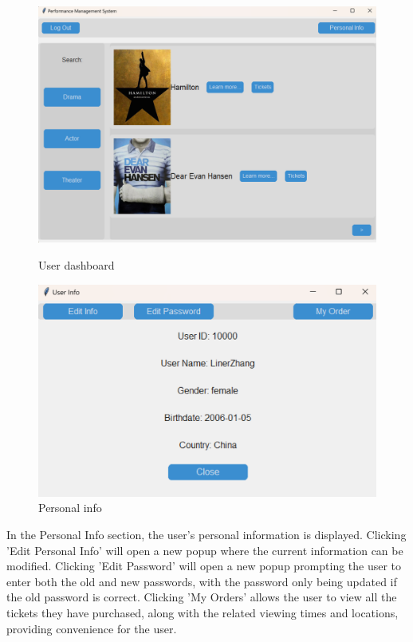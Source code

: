 \documentclass[12pt]{article}
\begin{document}
\begin{figure}[H]
    \centering
    \begin{minipage}{0.48\textwidth}
        \centering
        \includegraphics[width=\textwidth]{6.png}
        \caption{User dashboard}
        \label{Figure 6}
    \end{minipage}
    \hfill
    \begin{minipage}{0.48\textwidth}
        \centering
        \includegraphics[width=\textwidth]{7.png}
        \caption{Personal info}
        \label{Figure 7}
    \end{minipage}
\end{figure}
\par In the Personal Info section, the user's personal information is displayed. Clicking 'Edit Personal Info' will open a new popup where the current information can be modified. Clicking 'Edit Password' will open a new popup prompting the user to enter both the old and new passwords, with the password only being updated if the old password is correct. Clicking 'My Orders' allows the user to view all the tickets they have purchased, along with the related viewing times and locations, providing convenience for the user.
\end{document}
